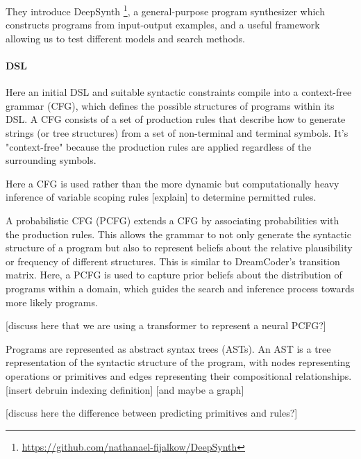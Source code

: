 They introduce DeepSynth \footnote{\url{https://github.com/nathanael-fijalkow/DeepSynth}}, a general-purpose program synthesizer which constructs programs from input-output examples, and a useful framework allowing us to test different models and search methods.
\paragraph{DSL} 

Here an initial DSL and suitable syntactic constraints compile into a context-free grammar (CFG), which defines the possible structures of programs within its DSL. A CFG consists of a set of production rules that describe how to generate strings (or tree structures) from a set of non-terminal and terminal symbols. It's "context-free" because the production rules are applied regardless of the surrounding symbols.

Here a CFG is used rather than the more dynamic but computationally heavy inference of variable scoping rules [explain] to determine permitted rules.

A probabilistic CFG (PCFG) extends a CFG by associating probabilities with the production rules. This allows the grammar to not only generate the syntactic structure of a program but also to represent beliefs about the relative plausibility or frequency of different structures. This is similar to DreamCoder's transition matrix. Here, a PCFG is used to capture prior beliefs about the distribution of programs within a domain, which guides the search and inference process towards more likely programs.

[discuss here that we are using a transformer to represent a neural PCFG?]

Programs are represented as abstract syntax trees (ASTs). An AST is a tree representation of the syntactic structure of the program, with nodes representing operations or primitives and edges representing their compositional relationships.
[insert debruin indexing definition]
[and maybe a graph]

[discuss here the difference between predicting primitives and rules?]



